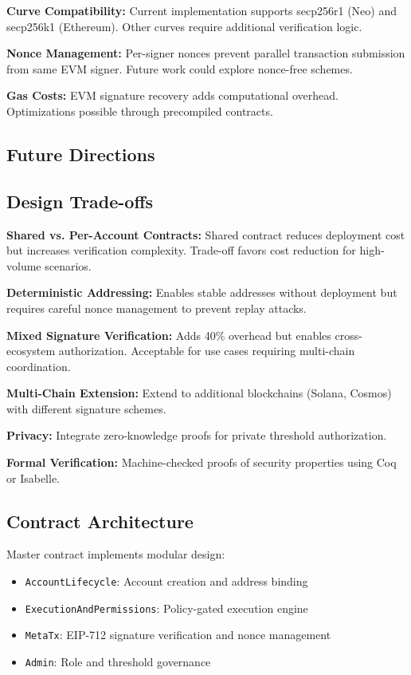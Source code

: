\documentclass[10pt,twocolumn]{article}
\begin{document}
\textbf{Curve Compatibility:} Current implementation supports secp256r1 (Neo) and secp256k1 (Ethereum). Other curves require additional verification logic.

\textbf{Nonce Management:} Per-signer nonces prevent parallel transaction submission from same EVM signer. Future work could explore nonce-free schemes.

\textbf{Gas Costs:} EVM signature recovery adds computational overhead. Optimizations possible through precompiled contracts.

\subsection{Future Directions}

\subsection{Design Trade-offs}

\textbf{Shared vs. Per-Account Contracts:} Shared contract reduces deployment cost but increases verification complexity. Trade-off favors cost reduction for high-volume scenarios.

\textbf{Deterministic Addressing:} Enables stable addresses without deployment but requires careful nonce management to prevent replay attacks.

\textbf{Mixed Signature Verification:} Adds 40\% overhead but enables cross-ecosystem authorization. Acceptable for use cases requiring multi-chain coordination.


\textbf{Multi-Chain Extension:} Extend to additional blockchains (Solana, Cosmos) with different signature schemes.

\textbf{Privacy:} Integrate zero-knowledge proofs for private threshold authorization.

\textbf{Formal Verification:} Machine-checked proofs of security properties using Coq or Isabelle.


\subsection{Contract Architecture}

Master contract implements modular design:
\begin{itemize}[leftmargin=*,topsep=2pt,itemsep=1pt]
\item \texttt{AccountLifecycle}: Account creation and address binding
\item \texttt{ExecutionAndPermissions}: Policy-gated execution engine
\item \texttt{MetaTx}: EIP-712 signature verification and nonce management
\item \texttt{Admin}: Role and threshold governance
\end{itemize}
\end{document}
